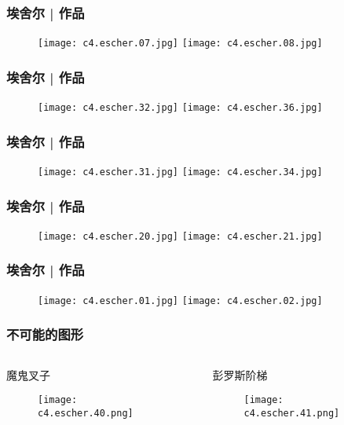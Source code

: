 \begin{frame}
  \frametitle{埃舍尔 | 作品}
  \begin{figure}
    \centering
    \texttt{[image: c4.escher.07.jpg]}\quad
    \texttt{[image: c4.escher.08.jpg]}
  \end{figure}
\end{frame}

\begin{frame}
  \frametitle{埃舍尔 | 作品}
  \begin{figure}
    \centering
    \texttt{[image: c4.escher.32.jpg]}\quad
    \texttt{[image: c4.escher.36.jpg]}
  \end{figure}
\end{frame}

\begin{frame}
  \frametitle{埃舍尔 | 作品}
  \begin{figure}
    \centering
    \texttt{[image: c4.escher.31.jpg]}\quad
    \texttt{[image: c4.escher.34.jpg]}
  \end{figure}
\end{frame}

\begin{frame}
  \frametitle{埃舍尔 | 作品}
  \begin{figure}
    \centering
    \texttt{[image: c4.escher.20.jpg]}\quad
    \texttt{[image: c4.escher.21.jpg]}
  \end{figure}
\end{frame}

\begin{frame}
  \frametitle{埃舍尔 | 作品}
  \begin{figure}
    \centering
    \texttt{[image: c4.escher.01.jpg]}\quad
    \texttt{[image: c4.escher.02.jpg]}
  \end{figure}
\end{frame}

\begin{frame}
  \frametitle{不可能的图形}
  \begin{columns}
    \begin{block}{魔鬼叉子}
      \begin{figure}
        \centering
        \texttt{[image: c4.escher.40.png]}
      \end{figure}
    \end{block}
    \begin{block}{彭罗斯阶梯}
      \begin{figure}
        \centering
        \texttt{[image: c4.escher.41.png]}
      \end{figure}
    \end{block}
  \end{columns}
\end{frame}

